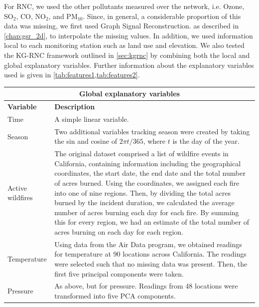 For RNC, we used the other pollutants measured over the network, i.e. Ozone, SO$_2$, CO, NO$_2$, and PM$_{10}$. Since, in general, a considerable proportion of this data was missing, we first used Graph Signal Reconstruction. as described in \cref{chap:gsr_2d}, to interpolate the missing values. In addition, we used information local to each monitoring station such as land use and elevation. We also tested the KG-RNC framework outlined in \cref{sec:kgrnc} by combining both the local and global explanatory variables. Further information about the explanatory variables used is given in \cref{tab:features1,tab:features2}. 



\begin{table}[ht]
    \renewcommand{\arraystretch}{1.8}
    \centering
    \begin{tabular}{|l|p{11cm}|}
    \hline
    \multicolumn{2}{|c|}{\textbf{Global explanatory variables}} \\
    \hline
    \textbf{Variable} & \textbf{Description} \\
    \hline

    Time & A simple linear variable. \\

    Season & Two additional variables tracking season were created by taking the sin and cosine of $2 \pi t / 365$, where $t$ is the day of the year. \\

    Active wildfires & The original dataset comprised a list of wildfire events in California, containing information including the geographical coordinates, the start date, the end date and the total number of acres burned. Using the coordinates, we assigned each fire into one of nine regions. Then, by dividing the total acres burned by the incident duration, we calculated the average number of acres burning each day for each fire. By summing this for every region, we had an estimate of the total number of acres burning on each day for each region. \\

    Temperature & Using data from the Air Data program, we obtained readings for temperature at 90 locations across California. The readings were selected such that no missing data was present. Then, the first five principal components were taken. \\

    Pressure & As above, but for pressure. Readings from 48 locations were transformed into five PCA components. \\


\end{tabular}
\end{table}
